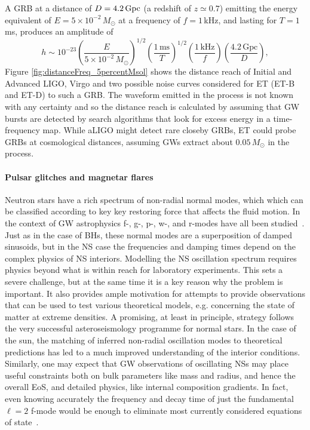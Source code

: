 A GRB at a distance of $D=4.2\,\rm Gpc$ (a redshift of $z\simeq 0.7$) 
emitting the energy equivalent of $E=5\times 10^{-2}\,M_\odot$ 
at a frequency of $f=1$\,kHz, and lasting for $T=1$\,ms, produces an amplitude of~\cite{springerlink:10.1007/s10714-010-1019-z}
%
\begin{equation}
h \sim 10^{-23}
\left ( \frac{E}{5\times 10^{-2}\,M_\odot} \right )^{1/2}
\left ( \frac{1\mathrm{\,ms}}{T} \right )^{1/2}
\left ( \frac{1\mathrm{\,kHz}}{f} \right )
\left ( \frac{4.2 \mathrm{\,Gpc}}{D} \right ),
\label {eq:amplitudeC}
\end{equation}
%
Figure \ref{fig:distanceFreq_5percentMsol} shows the distance 
reach of Initial and Advanced LIGO, Virgo and two possible noise curves considered
for ET (ET-B and ET-D)
to such a GRB. The waveform emitted in the process is not known with any certainty
and so the distance reach is calculated by assuming that GW bursts are detected
by search algorithms that look for excess energy in a time-frequency map.
While aLIGO might detect rare closeby GRBs, ET could probe GRBs at cosmological
distances, assuming GWs extract about $0.05\, M_\odot$ in the process.


\paragraph{Pulsar glitches and magnetar flares}
Neutron stars have a rich spectrum of non-radial normal modes, which 
which can be classified according to key key restoring force that 
affects the fluid motion. In the context of GW astrophysics f-, g-, p-, w-, 
and r-modes have all been studied~\cite{AnderssonKokkotas1998,Andersson:2003}.  
Just as in the case of BHs, these normal modes are a superposition of 
damped sinusoids, but in the NS case the frequencies and damping times 
depend on the complex physics of NS interiors.  Modelling the NS oscillation 
spectrum requires physics beyond what is within reach for laboratory 
experiments. This sets a severe challenge, but at the same time it is a key 
reason why the problem is important. It also provides ample motivation for 
attempts to provide observations that can be used to test various theoretical 
models, e.g. concerning the state of matter at extreme densities. A promising, 
at least in principle, strategy follows the very successful asteroseismology 
programme for normal stars. In the case of the sun, the matching of inferred 
non-radial oscillation modes to theoretical predictions has led to a much 
improved understanding of the interior conditions. Similarly, one may expect 
that GW observations of oscillating NSs may place useful constraints both 
on bulk parameters like mass and radius, and hence the overall EoS, and 
detailed physics, like internal composition gradients.  In fact, even 
knowing accurately the frequency and decay time of just the fundamental 
$\ell=2$ f-mode would be enough to eliminate most currently considered 
equations of state~\cite{AnderssonKokkotas1998}.

